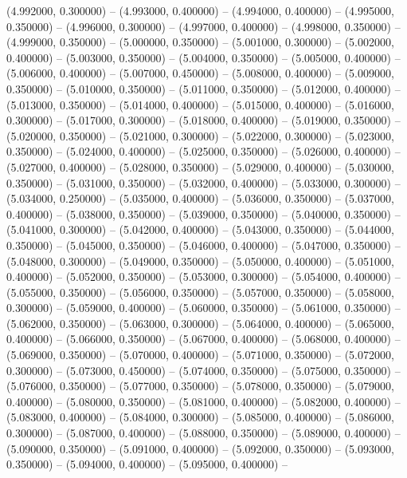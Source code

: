 (4.992000, 0.300000) -- 
(4.993000, 0.400000) -- 
(4.994000, 0.400000) -- 
(4.995000, 0.350000) -- 
(4.996000, 0.300000) -- 
(4.997000, 0.400000) -- 
(4.998000, 0.350000) -- 
(4.999000, 0.350000) -- 
(5.000000, 0.350000) -- 
(5.001000, 0.300000) -- 
(5.002000, 0.400000) -- 
(5.003000, 0.350000) -- 
(5.004000, 0.350000) -- 
(5.005000, 0.400000) -- 
(5.006000, 0.400000) -- 
(5.007000, 0.450000) -- 
(5.008000, 0.400000) -- 
(5.009000, 0.350000) -- 
(5.010000, 0.350000) -- 
(5.011000, 0.350000) -- 
(5.012000, 0.400000) -- 
(5.013000, 0.350000) -- 
(5.014000, 0.400000) -- 
(5.015000, 0.400000) -- 
(5.016000, 0.300000) -- 
(5.017000, 0.300000) -- 
(5.018000, 0.400000) -- 
(5.019000, 0.350000) -- 
(5.020000, 0.350000) -- 
(5.021000, 0.300000) -- 
(5.022000, 0.300000) -- 
(5.023000, 0.350000) -- 
(5.024000, 0.400000) -- 
(5.025000, 0.350000) -- 
(5.026000, 0.400000) -- 
(5.027000, 0.400000) -- 
(5.028000, 0.350000) -- 
(5.029000, 0.400000) -- 
(5.030000, 0.350000) -- 
(5.031000, 0.350000) -- 
(5.032000, 0.400000) -- 
(5.033000, 0.300000) -- 
(5.034000, 0.250000) -- 
(5.035000, 0.400000) -- 
(5.036000, 0.350000) -- 
(5.037000, 0.400000) -- 
(5.038000, 0.350000) -- 
(5.039000, 0.350000) -- 
(5.040000, 0.350000) -- 
(5.041000, 0.300000) -- 
(5.042000, 0.400000) -- 
(5.043000, 0.350000) -- 
(5.044000, 0.350000) -- 
(5.045000, 0.350000) -- 
(5.046000, 0.400000) -- 
(5.047000, 0.350000) -- 
(5.048000, 0.300000) -- 
(5.049000, 0.350000) -- 
(5.050000, 0.400000) -- 
(5.051000, 0.400000) -- 
(5.052000, 0.350000) -- 
(5.053000, 0.300000) -- 
(5.054000, 0.400000) -- 
(5.055000, 0.350000) -- 
(5.056000, 0.350000) -- 
(5.057000, 0.350000) -- 
(5.058000, 0.300000) -- 
(5.059000, 0.400000) -- 
(5.060000, 0.350000) -- 
(5.061000, 0.350000) -- 
(5.062000, 0.350000) -- 
(5.063000, 0.300000) -- 
(5.064000, 0.400000) -- 
(5.065000, 0.400000) -- 
(5.066000, 0.350000) -- 
(5.067000, 0.400000) -- 
(5.068000, 0.400000) -- 
(5.069000, 0.350000) -- 
(5.070000, 0.400000) -- 
(5.071000, 0.350000) -- 
(5.072000, 0.300000) -- 
(5.073000, 0.450000) -- 
(5.074000, 0.350000) -- 
(5.075000, 0.350000) -- 
(5.076000, 0.350000) -- 
(5.077000, 0.350000) -- 
(5.078000, 0.350000) -- 
(5.079000, 0.400000) -- 
(5.080000, 0.350000) -- 
(5.081000, 0.400000) -- 
(5.082000, 0.400000) -- 
(5.083000, 0.400000) -- 
(5.084000, 0.300000) -- 
(5.085000, 0.400000) -- 
(5.086000, 0.300000) -- 
(5.087000, 0.400000) -- 
(5.088000, 0.350000) -- 
(5.089000, 0.400000) -- 
(5.090000, 0.350000) -- 
(5.091000, 0.400000) -- 
(5.092000, 0.350000) -- 
(5.093000, 0.350000) -- 
(5.094000, 0.400000) -- 
(5.095000, 0.400000) -- 
